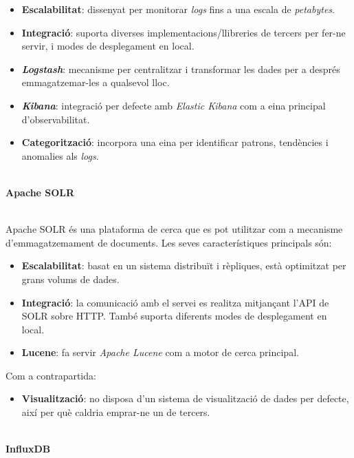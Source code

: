 \begin{itemize}
    \item \textbf{Escalabilitat}: dissenyat per monitorar \textit{\gls{log}s} fins a una escala de \textit{petabytes}.
    \item \textbf{Integració}: suporta diverses implementacions/llibreries de tercers per fer-ne servir, i modes de desplegament en local.
    \item \textbf{\textit{Logstash}}: mecanisme per centralitzar i transformar les dades per a després emmagatzemar-les a qualsevol lloc.
    \item \textbf{\textit{Kibana}}: integració per defecte amb \textit{Elastic Kibana} com a eina principal d’observabilitat.
    \item \textbf{Categorització}: incorpora una eina per identificar patrons, tendències i anomalies als \textit{\gls{log}s}.
\end{itemize}


\noindent \\
\textbf{Apache SOLR~\cite{SOLR}}

\noindent \\
Apache SOLR és una plataforma de cerca que es pot utilitzar com a mecanisme d’emmagatzemament de documents. 
Les seves característiques principals són:

\begin{itemize}
    \item \textbf{Escalabilitat}: basat en un sistema distribuït i rèpliques, està optimitzat per grans volums de dades.
    \item \textbf{Integració}: la comunicació amb el servei es realitza mitjançant l’\gls{API} de SOLR sobre \gls{HTTP}.
    També suporta diferents modes de desplegament en local.
    \item \textbf{Lucene}: fa servir \textit{Apache Lucene} com a motor de cerca principal.
\end{itemize}

\noindent
Com a contrapartida:

\begin{itemize}
    \item \textbf{Visualització}: no disposa d’un sistema de visualització de dades per defecte, així per què caldria emprar-ne un de tercers.
\end{itemize}

\clearpage

\noindent \\
\textbf{InfluxDB~\cite{influxdb}}

